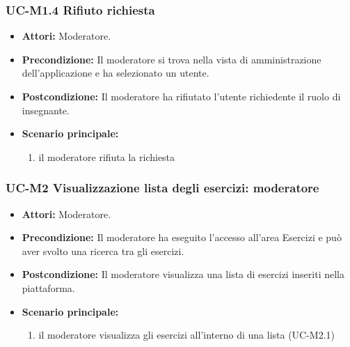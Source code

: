 \subsubsection{UC-M1.4 Rifiuto richiesta}
	\begin{itemize}
		\item \textbf{Attori:} Moderatore.
		\item \textbf{Precondizione:} Il moderatore si trova nella vista di amministrazione dell'applicazione e ha selezionato un utente.
		\item \textbf{Postcondizione:} Il moderatore ha rifiutato l'utente richiedente il ruolo di insegnante.
		\item \textbf{Scenario principale:}
			\begin{enumerate}
				\item il moderatore rifiuta la richiesta
			\end{enumerate}
	\end{itemize}

\subsubsection{UC-M2 Visualizzazione lista degli esercizi: moderatore}
	\begin{itemize}
		\item \textbf{Attori:} Moderatore.
		\item \textbf{Precondizione:} Il moderatore ha eseguito l'accesso all'area Esercizi e può aver svolto una ricerca tra gli esercizi.
		\item \textbf{Postcondizione:} Il moderatore visualizza una lista di esercizi inseriti nella piattaforma.
		\item \textbf{Scenario principale:}
			\begin{enumerate}
				\item il moderatore visualizza gli esercizi all'interno di una lista (UC-M2.1)
			\end{enumerate}
	\end{itemize}
		
